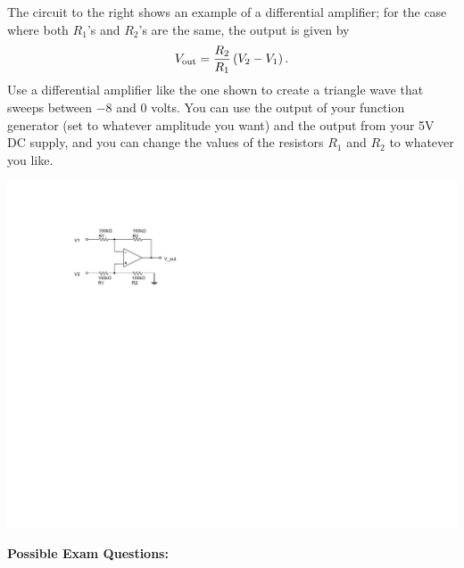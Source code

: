 \begin{enumerate}[wide]
\medskip
\begin{minipage}{.53\textwidth}
\item The circuit to the right shows an example of a differential amplifier; for the case where both $R_1$'s and $R_2$'s are the same, the output is given by  \label{part_differential}
\begin{equation*}
V_{\rm out} = \frac{R_2}{R_1} \left( V_2 - V_1 \right).
\end{equation*}
Use a differential amplifier like the one shown to create a triangle wave that sweeps between $-8$ and
0 volts.  You can use the output of your function generator (set to whatever amplitude you want) 
and the output from your 5V DC supply, and you can change the values of the resistors $R_1$ and $R_2$ to whatever you like.  
\end{minipage}
\begin{minipage}{.46\textwidth}
\begin{flushright}
\includegraphics{op-amps/differential_amp.pdf}

\end{flushright}
\end{minipage}



\end{enumerate}

\pagebreak[2]
\textbf{Possible Exam Questions:}

